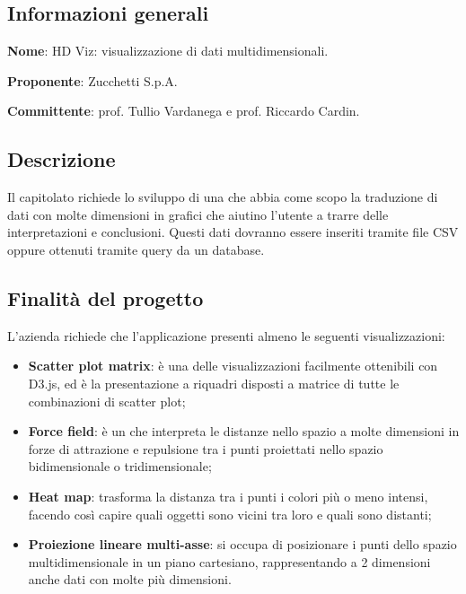 \documentclass[../studio_di_fattibilita.tex]{subfiles}
\begin{document}
\subsection{Informazioni generali}%
\label{sub:c4_informazioni_generale}
\begin{description}
	\item \textbf{Nome}: HD Viz: visualizzazione di dati multidimensionali.
	\item \textbf{Proponente}: Zucchetti S.p.A.
	\item \textbf{Committente}: prof. Tullio Vardanega e prof. Riccardo Cardin.
\end{description}

\subsection{Descrizione}%
\label{sub:c4_descrizione}
Il capitolato richiede lo sviluppo di una  che abbia come scopo la
traduzione di dati con molte dimensioni in grafici che aiutino l’utente a trarre delle interpretazioni e conclusioni. Questi dati dovranno essere inseriti tramite file CSV oppure ottenuti tramite query da un database.

\subsection{Finalità del progetto}%
\label{sub:c4_finalita_del_progetto}
L’azienda richiede che l’applicazione presenti almeno le seguenti visualizzazioni:
\begin{itemize}
	\item \textbf{Scatter plot matrix}: è una delle visualizzazioni facilmente ottenibili con D3.js, ed è la presentazione a riquadri disposti a matrice di tutte le combinazioni di scatter plot;
	\item \textbf{Force field}: è un  che interpreta le distanze nello spazio a molte dimensioni in forze di attrazione e repulsione tra i punti proiettati nello spazio bidimensionale o tridimensionale;
	\item \textbf{Heat map}: trasforma la distanza tra i punti i colori più o meno intensi, facendo così capire quali oggetti sono vicini tra loro e quali sono distanti;
	\item \textbf{Proiezione lineare multi-asse}: si occupa di posizionare i punti dello spazio multidimensionale in un piano cartesiano, rappresentando a 2 dimensioni anche dati con molte più dimensioni.
\end{itemize}
\end{document}

